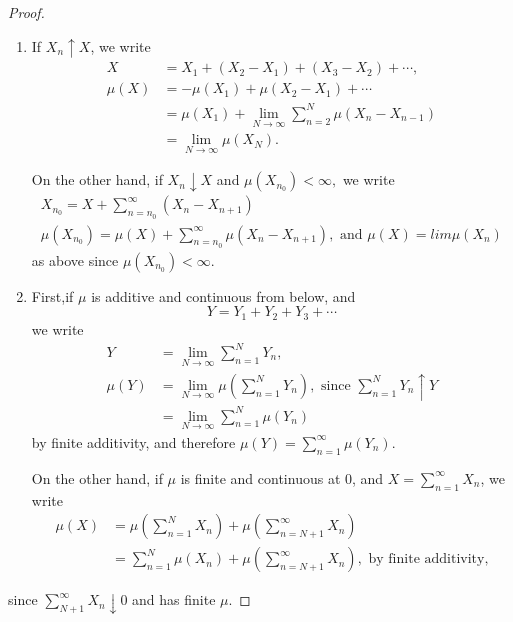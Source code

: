 \begin{proof}
  \begin{enumerate}
    \renewcommand{\theenumi}{\alph{enumi}}
    \renewcommand{\labelenumi}{(\theenumi)}
  \item If $X_n \uparrow X$, we write
    \begin{align*}
      X &=X_1 + (X_2 - X_1) + (X_3 - X_2) +\cdots,\\
      \mu(X) &=-\mu(X_1) + \mu(X_2 -X_1) +\cdots\\
      &=\mu(X_1) + \lim_{N \rightarrow \infty} \sum^{N}_{n=2} \mu(X_n - X_{n-1})\\
      &=\lim_{N \rightarrow \infty} \mu(X_N).
    \end{align*}
    
    On the other hand, if $X_n \downarrow X$  and $\mu(X_{n_0}) <
    \infty,$ we write 
    \begin{gather*}
      X_{n_0} = X + \sum^{\infty}_{n={n_0}} (X_n - X_{n+1})\\
      \mu (X_{n_0}) = \mu (X) + \sum^{\infty}_{n={n_0}} \mu
      (X_n - X_{n+1}), \text { and } \mu (X) =  lim  \mu (X_n) 
    \end{gather*}
    as above  since $\mu (X_{n_0})<\infty$. 
  \item First,\pageoriginale if $\mu$ is additive and continuous from below, and 
    $$ 
    Y= Y_1 + Y_2 + Y_3 +\cdots
    $$
    we write 
    \begin{align*}
      Y &= \lim_{N \rightarrow \infty} \sum^{N}_{n=1} Y_n,\\
      \mu (Y) &= \lim_{N \rightarrow \infty}\mu\left(\sum^{N}_{n=1}
      Y_n\right), \text{ since }\sum^{N}_{n=1} Y_n \uparrow Y\\
      &=\lim_{N \rightarrow \infty} \sum^{N}_{n=1} \mu (Y_n)
    \end{align*}
    by finite additivity, and therefore $\mu(Y) =
    \sum\limits^{\infty}_{n=1} \mu(Y_n)$. 
    
    On the other hand, if $\mu$ is finite and continuous at 
    0, and $X = \sum\limits^{\infty}_{n=1} X_n $, we write  
    \begin{align*}
      \mu (X) &= \mu \left(\sum^{N}_{n=1} X_n\right) + \mu
      \left(\sum^{\infty}_{n=N+1} X_n\right)\\ 
      & = \sum^{N}_{n=1} \mu(X_n) + \mu \left(\sum^{\infty}_{n=N+1}
      X_n\right), \text { by finite additivity,} 
    \end{align*}
  \end{enumerate}
    since $\sum\limits^{\infty}_{N+1} X_n \downarrow 0$ and has finite $\mu$.
\end{proof}

